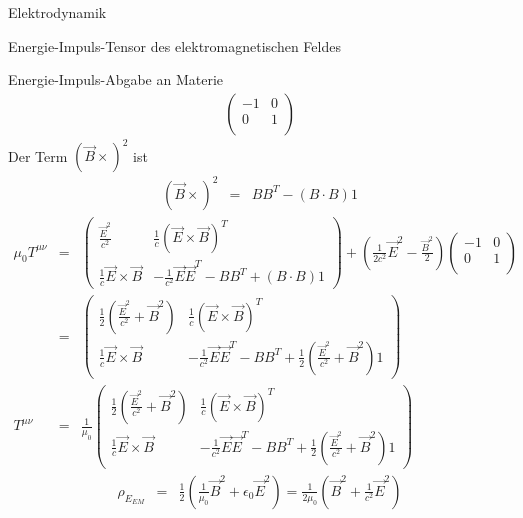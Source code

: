 \begin{chapter}{\titlestr}
\begin{section}{Elektrodynamik}
\begin{subsection}{Energie-Impuls-Tensor des elektromagnetischen Feldes}
\begin{subsubsection}{Energie-Impuls-Abgabe an Materie}
\begin{eqnarray*}
\begin{pmatrix}
-1 & 0\\
0 &1\\
\end{pmatrix}
\end{eqnarray*}
Der Term $\left(\vec{B}\times\right)^2$ ist
\begin{eqnarray*}
\left(\vec{B}\times\right)^2 &=& BB^T-(B\cdot B)1
\end{eqnarray*}
\begin{eqnarray*}
\mu_0T^{\mu\nu} &=&
\begin{pmatrix}
\frac{\vec{E}^2}{c^2} &\frac{1}{c}\left(\vec{E}\times\vec{B}\right)^T\\
\frac{1}{c}\vec{E}\times\vec{B} &-\frac{1}{c^2}\vec{E}\vec{E}^T-BB^T+(B\cdot B)1
\end{pmatrix}
+\left(\frac{1}{2c^2}\vec{E}^2-\frac{\vec{B}^2}{2}\right)\begin{pmatrix}
-1 & 0\\
0 &1\\
\end{pmatrix}\\
&=&\begin{pmatrix}
\frac{1}{2}\left(\frac{\vec{E}^2}{c^2}+\vec{B}^2\right) &\frac{1}{c}\left(\vec{E}\times\vec{B}\right)^T\\
\frac{1}{c}\vec{E}\times\vec{B} &-\frac{1}{c^2}\vec{E}\vec{E}^T-BB^T+\frac{1}{2}\left(\frac{\vec{E}^2}{c^2}+\vec{B}^2\right)1
\end{pmatrix}\\
T^{\mu\nu} &=&\frac{1}{\mu_0}\begin{pmatrix}
\frac{1}{2}\left(\frac{\vec{E}^2}{c^2}+\vec{B}^2\right) &\frac{1}{c}\left(\vec{E}\times\vec{B}\right)^T\\
\frac{1}{c}\vec{E}\times\vec{B} &-\frac{1}{c^2}\vec{E}\vec{E}^T-BB^T+\frac{1}{2}\left(\frac{\vec{E}^2}{c^2}+\vec{B}^2\right)1
\end{pmatrix}
\end{eqnarray*}
\begin{eqnarray*}
\label{relt_EM_energyDensity}
\rho_{E_{EM}} &=& \frac{1}{2}\left(\frac{1}{\mu_0}\vec{B}^2+\epsilon_0\vec{E}^2\right)
=\frac{1}{2\mu_0}\left(\vec{B}^2+\frac{1}{c^2}\vec{E}^2\right)
\end{eqnarray*}


\end{subsubsection}
\end{subsection}
\end{section}
\end{chapter}
